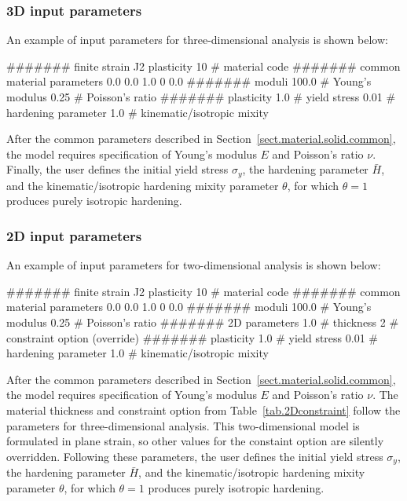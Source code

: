 \subsubsection{3D input parameters}
An example of input parameters for three-dimensional analysis is shown 
below:
\begin{inputfile}
####### finite strain J2 plasticity
10    # material code
####### common material parameters
0.0    0.0    1.0
0      0.0
####### moduli
100.0 # Young's modulus
0.25  # Poisson's ratio
####### plasticity
1.0   # yield stress
0.01  # hardening parameter
1.0   # kinematic/isotropic mixity
\end{inputfile}
After the common parameters described in 
Section~\ref{sect.material.solid.common}, the 
model requires specification of Young's modulus 
$E$ and Poisson's ratio $\nu$. Finally, the user defines the initial 
yield stress $\sigma_{y}$, the hardening parameter $\bar{H}$, and the 
kinematic/isotropic hardening mixity parameter $\theta$, 
for which $\theta = 1$ produces purely isotropic hardening.

\subsubsection{2D input parameters}
An example of input parameters for two-dimensional analysis is shown 
below:
\begin{inputfile}
####### finite strain J2 plasticity
10    # material code
####### common material parameters
0.0    0.0    1.0
0      0.0
####### moduli
100.0 # Young's modulus
0.25  # Poisson's ratio
####### 2D parameters
1.0   # thickness
2     # constraint option (override)
####### plasticity
1.0   # yield stress
0.01  # hardening parameter
1.0   # kinematic/isotropic mixity
\end{inputfile}
After the common parameters described in 
Section~\ref{sect.material.solid.common}, the 
model requires specification of Young's modulus 
$E$ and Poisson's ratio $\nu$. 
The material thickness and 
constraint option from Table~\ref{tab.2Dconstraint} 
follow the parameters for three-dimensional analysis.
This two-dimensional model is formulated in plane strain,
so other values for the constaint option are silently
overridden.
Following these parameters, 
the user defines the initial 
yield stress $\sigma_{y}$, the hardening parameter $\bar{H}$, and the 
kinematic/isotropic hardening mixity parameter $\theta$, 
for which $\theta = 1$ produces purely isotropic hardening.

